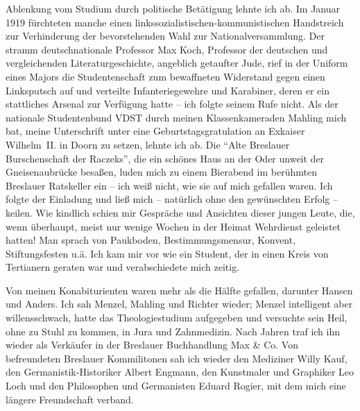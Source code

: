 \documentclass[a5paper,pagesize,10pt,twoside=true]{scrbook}
\begin{document}
Ablenkung vom Studium durch politische Betätigung lehnte ich ab. Im Januar 1919 fürchteten manche einen linkssozialistischen-kommunistischen Handstreich zur Verhinderung der bevorstehenden Wahl zur Nationalversammlung. Der stramm deutschnationale Professor Max Koch, Professor der deutschen und vergleichenden Literaturgeschichte, angeblich getaufter Jude, rief in der Uniform eines Majors die Studentenschaft zum bewaffneten Widerstand gegen einen Linksputsch auf und verteilte Infanteriegewehre und Karabiner, deren er ein stattliches Arsenal zur Verfügung hatte -- ich folgte seinem Rufe nicht. Als der nationale Studentenbund VDST durch meinen Klassenkameraden Mahling mich bat, meine Unterschrift unter eine Geburtstagsgratulation an Exkaiser Wilhelm~II. in Doorn zu setzen, lehnte ich ab. Die \enquote{Alte Breslauer Burschenschaft der Raczeks}, die ein schönes Haus an der Oder unweit der Gneisenaubrücke besaßen, luden mich zu einem Bierabend im berühmten Breslauer Ratskeller ein -- ich weiß nicht, wie sie auf mich gefallen waren. Ich folgte der Einladung und ließ mich -- natürlich ohne den gewünschten Erfolg -- keilen. Wie kindlich schien mir Gespräche und Ansichten dieser jungen Leute, die, wenn überhaupt, meist nur wenige Wochen in der Heimat Wehrdienst geleistet hatten! Man sprach von Paukboden, Bestimmungsmensur, Konvent, Stiftungsfesten u.ä. Ich kam mir vor wie ein Student, der in einen Kreis von Tertianern geraten war und verabschiedete mich zeitig.

Von meinen Konabiturienten waren mehr als die Hälfte gefallen, darunter Hansen und Anders. Ich sah Menzel, Mahling und Richter wieder; Menzel intelligent aber willensschwach, hatte das Theologiestudium aufgegeben und versuchte sein Heil, ohne zu Stuhl zu kommen, in Jura und Zahnmedizin. Nach Jahren traf ich ihn wieder als Verkäufer in der Breslauer Buchhandlung Max \& Co. Von befreundeten Breslauer Kommilitonen sah ich wieder den Mediziner Willy Kauf, den Germanistik-Historiker Albert Engmann, den Kunstmaler und Graphiker Leo Loch und den Philosophen und Germanisten Eduard Rogier, mit dem mich eine längere Freundschaft verband.
\end{document}

